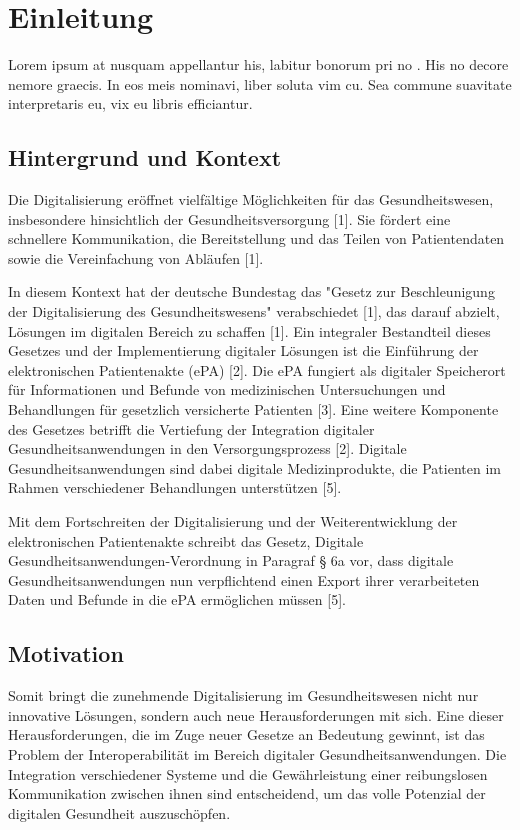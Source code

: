 \chapter{Einleitung}
\label{ch:intro}
Lorem ipsum at nusquam appellantur his, labitur bonorum pri no \citep{dueck:trio}. His no decore nemore graecis. In eos meis nominavi, liber soluta vim cu. Sea commune suavitate interpretaris eu, vix eu libris efficiantur.

%
%
\section{Hintergrund und Kontext}
\label{sec:intro:context}
Die Digitalisierung eröffnet vielfältige Möglichkeiten für das Gesundheitswesen, insbesondere hinsichtlich der Gesundheitsversorgung [1]. Sie fördert eine schnellere Kommunikation, die Bereitstellung und das Teilen von Patientendaten sowie die Vereinfachung von Abläufen [1].

In diesem Kontext hat der deutsche Bundestag das "Gesetz zur Beschleunigung der Digitalisierung des Gesundheitswesens" verabschiedet [1], das darauf abzielt, Lösungen im digitalen Bereich zu schaffen [1]. Ein integraler Bestandteil dieses Gesetzes und der Implementierung digitaler Lösungen ist die Einführung der elektronischen Patientenakte (ePA) [2]. Die ePA fungiert als digitaler Speicherort für Informationen und Befunde von medizinischen Untersuchungen und Behandlungen für gesetzlich versicherte Patienten [3]. Eine weitere Komponente des Gesetzes betrifft die Vertiefung der Integration digitaler Gesundheitsanwendungen in den Versorgungsprozess [2]. Digitale Gesundheitsanwendungen sind dabei digitale Medizinprodukte, die Patienten im Rahmen verschiedener Behandlungen unterstützen [5].

Mit dem Fortschreiten der Digitalisierung und der Weiterentwicklung der elektronischen Patientenakte schreibt das Gesetz, Digitale Gesundheitsanwendungen-Verordnung in Paragraf § 6a vor, dass digitale Gesundheitsanwendungen nun verpflichtend einen Export ihrer verarbeiteten Daten und Befunde in die ePA ermöglichen müssen [5].



%
%
\section{Motivation}
\label{sec:intro:motivation}
Somit bringt die zunehmende Digitalisierung im Gesundheitswesen nicht nur innovative Lösungen, sondern auch neue Herausforderungen mit sich. Eine dieser Herausforderungen, die im Zuge neuer Gesetze an Bedeutung gewinnt, ist das Problem der Interoperabilität im Bereich digitaler Gesundheitsanwendungen. Die Integration verschiedener Systeme und die Gewährleistung einer reibungslosen Kommunikation zwischen ihnen sind entscheidend, um das volle Potenzial der digitalen Gesundheit auszuschöpfen.


